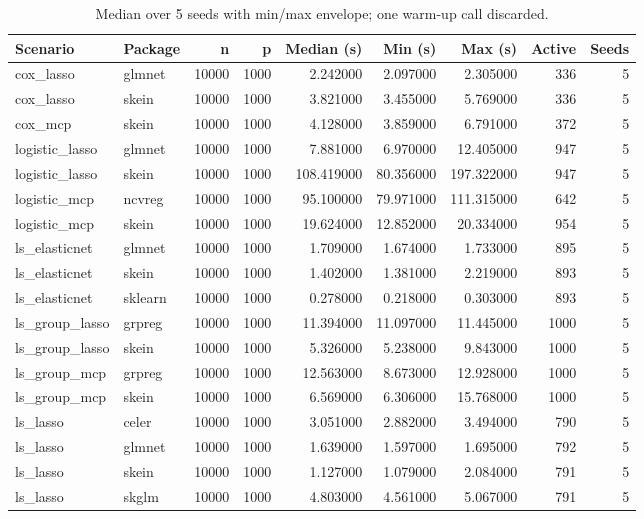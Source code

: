 \begin{table}[t]
  \centering
  \caption{Median over 5 seeds with min/max envelope; one warm-up call discarded.}
  \label{tab:headline_timings}
\begin{tabular}{llrrrrrrr}
\toprule
Scenario & Package & n & p & Median (s) & Min (s) & Max (s) & Active & Seeds \\
\midrule
cox_lasso & glmnet & 10000 & 1000 & 2.242000 & 2.097000 & 2.305000 & 336 & 5 \\
cox_lasso & skein & 10000 & 1000 & 3.821000 & 3.455000 & 5.769000 & 336 & 5 \\
cox_mcp & skein & 10000 & 1000 & 4.128000 & 3.859000 & 6.791000 & 372 & 5 \\
logistic_lasso & glmnet & 10000 & 1000 & 7.881000 & 6.970000 & 12.405000 & 947 & 5 \\
logistic_lasso & skein & 10000 & 1000 & 108.419000 & 80.356000 & 197.322000 & 947 & 5 \\
logistic_mcp & ncvreg & 10000 & 1000 & 95.100000 & 79.971000 & 111.315000 & 642 & 5 \\
logistic_mcp & skein & 10000 & 1000 & 19.624000 & 12.852000 & 20.334000 & 954 & 5 \\
ls_elasticnet & glmnet & 10000 & 1000 & 1.709000 & 1.674000 & 1.733000 & 895 & 5 \\
ls_elasticnet & skein & 10000 & 1000 & 1.402000 & 1.381000 & 2.219000 & 893 & 5 \\
ls_elasticnet & sklearn & 10000 & 1000 & 0.278000 & 0.218000 & 0.303000 & 893 & 5 \\
ls_group_lasso & grpreg & 10000 & 1000 & 11.394000 & 11.097000 & 11.445000 & 1000 & 5 \\
ls_group_lasso & skein & 10000 & 1000 & 5.326000 & 5.238000 & 9.843000 & 1000 & 5 \\
ls_group_mcp & grpreg & 10000 & 1000 & 12.563000 & 8.673000 & 12.928000 & 1000 & 5 \\
ls_group_mcp & skein & 10000 & 1000 & 6.569000 & 6.306000 & 15.768000 & 1000 & 5 \\
ls_lasso & celer & 10000 & 1000 & 3.051000 & 2.882000 & 3.494000 & 790 & 5 \\
ls_lasso & glmnet & 10000 & 1000 & 1.639000 & 1.597000 & 1.695000 & 792 & 5 \\
ls_lasso & skein & 10000 & 1000 & 1.127000 & 1.079000 & 2.084000 & 791 & 5 \\
ls_lasso & skglm & 10000 & 1000 & 4.803000 & 4.561000 & 5.067000 & 791 & 5 \\

\end{tabular}
\end{table}
